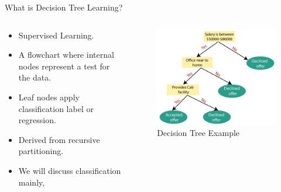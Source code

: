 \documentclass[xcolor={svgnames},
               hyperref={colorlinks,citecolor=DeepPink4,linkcolor=FireBrick,urlcolor=Maroon}]
               {beamer}
\begin{document}
\begin{frame}{What is Decision Tree Learning?}
    \begin{columns}[T]
      \begin{column}{.60\textwidth}
        \begin{center}
        \begin{itemize}
            \item Supervised Learning.  
            \item A flowchart where internal nodes represent a test for the data.
            \item Leaf nodes apply classification label or regression.
            \item Derived from recursive partitioning. 
            \item We will discuss classification mainly, 
        \end{itemize}
      \end{center}
      \end{column}
      \begin{column}{.50\textwidth}
            \begin{figure}
              \vspace*{\fill}
              \begin{center}
            \includegraphics[width=.75\textwidth]{ExampleTree.png}
          \caption{Decision Tree Example}
              \end{center}
              \vspace*{\fill}
            \end{figure}
          \end{column}
    \end{columns}
  \end{frame}
\end{document}
